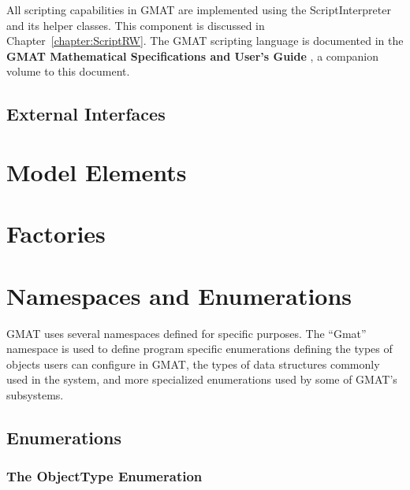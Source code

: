 All scripting capabilities in GMAT are implemented using the ScriptInterpreter and its helper
classes.  This component is discussed in Chapter~\ref{chapter:ScriptRW}.  The GMAT scripting
language is documented in the \textbf{GMAT Mathematical Specifications and User's Guide}
\cite{mathSpec}, a companion volume to this document.

\subsection{External Interfaces}



\section{\label{section:ModelOverview}Model Elements}



\section{\label{section:FactoryOverview}Factories}



\section{\label{section:Namespaces}Namespaces and Enumerations}

GMAT uses several namespaces defined for specific purposes.  The ``Gmat'' namespace is used to
define program specific enumerations defining the types of objects users can configure in GMAT, the
types of data structures commonly used in the system, and more specialized enumerations used by
some of GMAT's subsystems.

\subsection{Enumerations}

\subsubsection{The ObjectType Enumeration}

